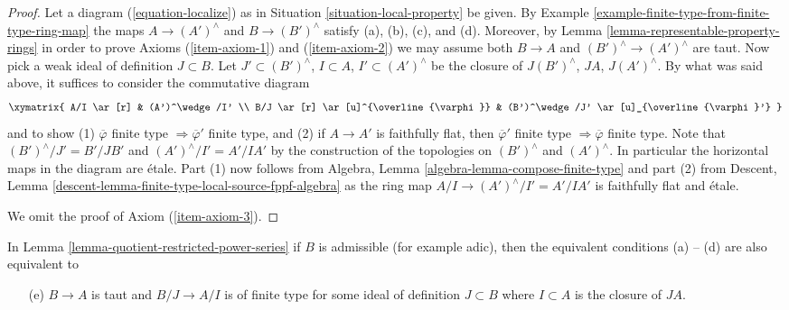 \begin{proof}
\medskip\noindent
Let a diagram (\ref{equation-localize}) as in
Situation \ref{situation-local-property}
be given. By Example \ref{example-finite-type-from-finite-type-ring-map}
the maps $A \to (A')^\wedge$ and $B \to (B')^\wedge$
satisfy (a), (b), (c), and (d). Moreover, by
Lemma \ref{lemma-representable-property-rings}
in order to prove Axioms (\ref{item-axiom-1}) and (\ref{item-axiom-2})
we may assume both $B \to A$ and $(B')^\wedge \to (A')^\wedge$
are taut. Now pick a weak ideal of definition $J \subset B$. Let
$J' \subset (B')^\wedge$, $I \subset A$, $I' \subset (A')^\wedge$
be the closure of $J(B')^\wedge$, $JA$, $J(A')^\wedge$.
By what was said above, it suffices to consider the commutative
diagram
$$
\xymatrix{
A/I \ar[r] & (A')^\wedge/I' \\
B/J \ar[r] \ar[u]^{\overline{\varphi}} &
(B')^\wedge/J' \ar[u]_{\overline{\varphi}'}
}
$$
and to show (1) $\overline{\varphi}$ finite type
$\Rightarrow \overline{\varphi}'$
finite type, and (2) if $A \to A'$ is faithfully flat, then
$\overline{\varphi}'$ finite type $\Rightarrow \overline{\varphi}$
finite type. Note that $(B')^\wedge/J' = B'/JB'$ and
$(A')^\wedge/I' = A'/IA'$ by the construction of the topologies on
$(B')^\wedge$ and $(A')^\wedge$. In particular the horizontal
maps in the diagram are \'etale. Part (1) now follows from
Algebra, Lemma \ref{algebra-lemma-compose-finite-type}
and part (2) from
Descent, Lemma \ref{descent-lemma-finite-type-local-source-fppf-algebra}
as the ring map $A/I \to (A')^\wedge/I' = A'/IA'$ is faithfully flat
and \'etale.

\medskip\noindent
We omit the proof of Axiom (\ref{item-axiom-3}).
\end{proof}

\begin{lemma}
\label{lemma-quotient-restricted-power-series-admissible}
In Lemma \ref{lemma-quotient-restricted-power-series}
if $B$ is admissible (for example adic), then the equivalent conditions
(a) -- (d) are also equivalent to
\begin{enumerate}
\item[(e)] $B \to A$ is taut and $B/J \to A/I$ is of finite type for
some ideal of definition $J \subset B$ where $I \subset A$ is
the closure of $JA$.
\end{enumerate}
\end{lemma}

